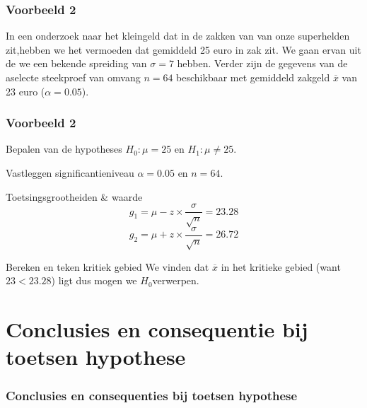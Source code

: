 \documentclass{beamer}
\begin{document}
\begin{frame}
  \frametitle{Voorbeeld 2}
  In een onderzoek naar het kleingeld dat in de zakken van  van  onze superhelden zit,hebben we het vermoeden dat gemiddeld 25 euro in zak zit. We gaan ervan uit de we een bekende spreiding van $\sigma = 7$ hebben. Verder zijn de gegevens van de aselecte steekproef van omvang $n=64$ beschikbaar met gemiddeld zakgeld $\overline{x}$ van 23 euro  ($\alpha = 0.05$).
\end{frame}

\begin{frame}
  \frametitle{Voorbeeld 2}
  \begin{block}{Bepalen van de hypotheses}
  $H_{0} : \mu = 25$ en $H_{1}: \mu \neq 25$.
  \end{block}

  \begin{block}{Vastleggen significantieniveau}
  $\alpha = 0.05$ en $n=64$.
  \end{block}

  \begin{block}{Toetsingsgrootheiden \& waarde}
    \[ g_{1} = \mu - z \times \frac{\sigma}{\sqrt{n}} = 23.28 \]
    \[ g_{2} = \mu + z \times \frac{\sigma}{\sqrt{n}} = 26.72 \]
    \end{block}

    \begin{block}{Bereken en teken kritiek gebied}
      We vinden dat $\overline{x}$ in het kritieke gebied (want $23 < 23.28$) ligt dus mogen we $H_{0}$verwerpen.
  \end{block}
\end{frame}

\section{Conclusies en consequentie bij toetsen hypothese}
\begin{frame}
  \frametitle{Conclusies en consequenties bij toetsen hypothese}


\begin{table}
  \centering
  \caption{Conclusies en consequenties bij toetsen van hypothese}
  \label{tab:hypfouten}
\end{table}
\end{frame}
\end{document}
